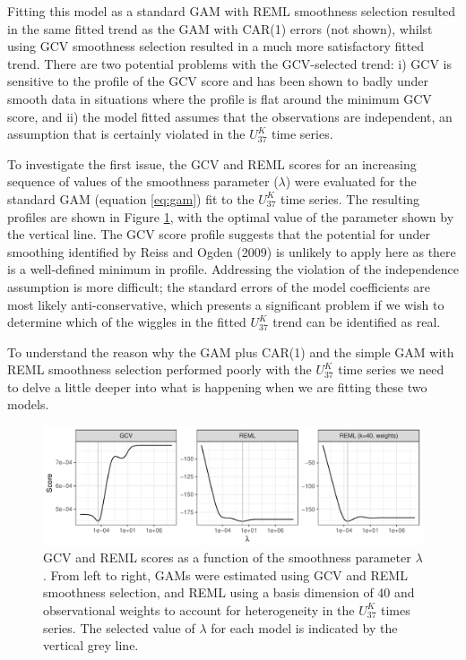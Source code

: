 \documentclass[12pt,]{article}
\newcommand{\uk}{\ensuremath{\mathit{U}^{\mathit{K}}_{\mathup{37}}}}
\begin{document}
Fitting this model as a standard GAM with REML smoothness selection
resulted in the same fitted trend as the GAM with CAR(1) errors (not
shown), whilst using GCV smoothness selection resulted in a much more
satisfactory fitted trend. There are two potential problems with the
GCV-selected trend: i) GCV is sensitive to the profile of the GCV score
and has been shown to badly under smooth data in situations where the
profile is flat around the minimum GCV score, and ii) the model fitted
assumes that the observations are independent, an assumption that is
certainly violated in the \uk{} time series.

To investigate the first issue, the GCV and REML scores for an
increasing sequence of values of the smoothness parameter (\(\lambda\))
were evaluated for the standard GAM (equation \eqref{eq:gam}) fit to the
\uk{} time series. The resulting profiles are shown in Figure
\ref{fig:trace-smoothness-parameters}, with the optimal value of the
parameter shown by the vertical line. The GCV score profile suggests
that the potential for under smoothing identified by Reiss and Ogden
(2009) is unlikely to apply here as there is a well-defined minimum in
profile. Addressing the violation of the independence assumption is more
difficult; the standard errors of the model coefficients are most likely
anti-conservative, which presents a significant problem if we wish to
determine which of the wiggles in the fitted \uk{} trend can be
identified as real.

To understand the reason why the GAM plus CAR(1) and the simple GAM with
REML smoothness selection performed poorly with the \uk{} time series we
need to delve a little deeper into what is happening when we are fitting
these two models.

\begin{figure}

{\centering \includegraphics[width=0.8\linewidth]{manuscript_files/figure-latex/trace-smoothness-parameters-1} 

}

\caption{GCV and REML scores as a function of the smoothness parameter $\lambda$. From left to right, GAMs were estimated using GCV and REML smoothness selection, and REML using a basis dimension of 40 and observational weights to account for heterogeneity in the \uk{} times series. The selected value of $\lambda$ for each model is indicated by the vertical grey line.}\label{fig:trace-smoothness-parameters}
\end{figure}
\end{document}
